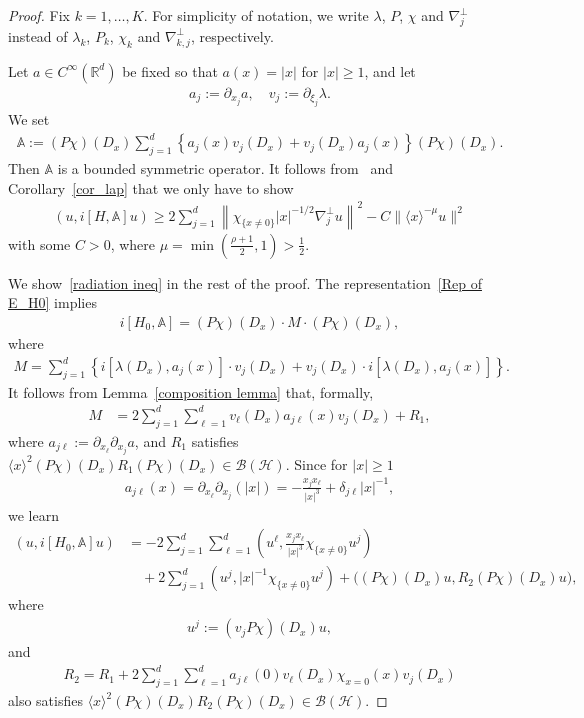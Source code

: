 \documentclass[10pt]{amsart}
\theoremstyle{definition}\newtheorem{defi}[theo]{Definition}\newtheorem{rema}[theo]{Remark}\newtheorem{exam}[theo]{Example}\newtheorem{exem}[theo]{Example}\newtheorem{nota}[theo]{Notation}
\renewcommand{\d}{\delta}
\renewcommand{\l}{\lambda}
\newcommand{\x}{\xi}
\newcommand{\R}{\mathbb{R}}
\newcommand{\bbA}{\mathbb{A}}
\newcommand{\HS}{\mathcal{H}}
\newcommand{\BS}{\mathcal{B}}
\newcommand{\jap}[1]{\langle #1 \rangle}
\begin{document}
\begin{proof}
Fix $k=1,\dots,K$. For simplicity of notation, we write $\l$, $P$, $\chi$ and $\nabla_j^\perp$ instead of $\l_k$, $P_k$, $\chi_k$ and $\nabla_{k,j}^\perp$, respectively.

Let $a\in C^\infty(\R^d)$ be fixed so that $a(x)=|x|$ for $|x|\geq1$, and let
\begin{align*}
a_j:=\partial_{x_j}a, \quad v_j:=\partial_{\x_j}\l.
\end{align*}
We set
\begin{align*}
\bbA := (P\chi)(D_x) \sum_{j=1}^d \left\{a_j(x)v_j(D_x)+v_j(D_x)a_j(x) \right\} (P\chi)(D_x).
\end{align*}
Then $\bbA$ is a bounded symmetric operator. It follows from~\cite[Proposition~0.5.11]{Y} and Corollary~\ref{cor_lap} that we only have to show
\begin{align}\label{radiation ineq}
\left(u, i[H,\bbA]u\right)
\geq 2\sum_{j=1}^d \left\| \chi_{\{x\neq0\}}|x|^{-1/2} \nabla_{j}^\perp u \right\|^2 -C\|\jap{x}^{-\mu}u\|^2
\end{align}
with some $C>0$, where $\mu=\min(\frac{\rho+1}{2},1)>\frac12$.

We show~\eqref{radiation ineq} in the rest of the proof. The representation~\eqref{Rep of E_H0} implies
\begin{align*}
i[H_0,\bbA] = (P\chi)(D_x) \cdot M \cdot (P\chi)(D_x),
\end{align*}
where
\begin{align*}
M = \sum_{j=1}^d \left\{i\left[\l(D_x),a_j(x)\right] \cdot v_j(D_x) + v_j(D_x) \cdot i\left[\l(D_x),a_j(x)\right] \right\}.
\end{align*}
It follows from Lemma~\ref{composition lemma} that, formally,
\begin{align*}
M &= 2 \sum_{j=1}^d \sum_{\ell=1}^d v_\ell(D_x)a_{j\ell}(x) v_j(D_x) + R_1,
\end{align*}
where $a_{j\ell}:=\partial_{x_\ell}\partial_{x_j}a$, and $R_1$ satisfies $\jap{x}^2 (P\chi)(D_x) R_1 (P\chi)(D_x) \in \BS(\HS)$. Since for $|x|\geq1$
\begin{align*}
a_{j\ell}(x) = \partial_{x_\ell}\partial_{x_j}\left(|x|\right) = -\frac{x_j x_\ell}{|x|^3} + \d_{j\ell} |x|^{-1},
\end{align*}
we learn
\begin{equation}\label{radiation pf commutator}
\begin{split}
(u,i[H_0,\bbA]u) 
&= -2 \sum_{j=1}^d \sum_{\ell=1}^d \left(u^\ell, \frac{x_j x_\ell}{|x|^3} \chi_{\{x\neq0\}} u^j\right) \\
&\quad+2 \sum_{j=1}^d \left(u^j, |x|^{-1}\chi_{\{x\neq0\}}u^j\right)
 + \bigl((P\chi)(D_x)u, R_2 (P\chi)(D_x)u\bigr), 
\end{split}
\end{equation}
where
\begin{align*}
u^j:= (v_j P\chi)(D_x) u,
\end{align*}
and
\begin{align*}
R_2= R_1 + 2 \sum_{j=1}^d \sum_{\ell=1}^d a_{j\ell}(0) v_\ell(D_x) \chi_{x=0}(x) v_j(D_x)
\end{align*}
also satisfies $\jap{x}^2 (P\chi)(D_x) R_2 (P\chi)(D_x) \in \BS(\HS)$.


\end{proof}
\end{document}
